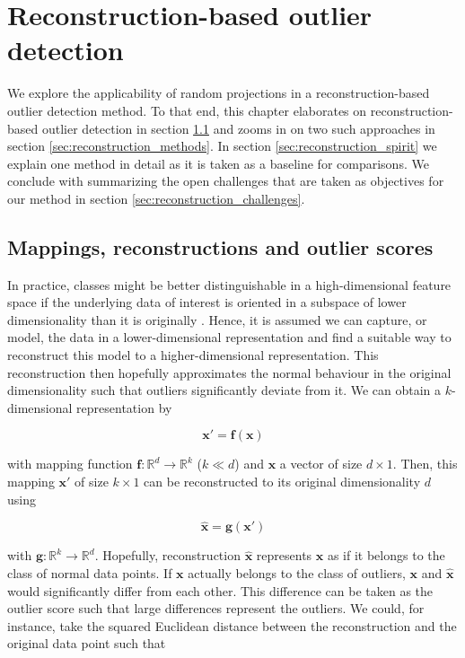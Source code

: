 \chapter{Reconstruction-based outlier detection}
\label{chap:reconstruction-detection}

We explore the applicability of random projections in a reconstruction-based outlier detection method.
To that end, this chapter elaborates on reconstruction-based outlier detection in section \ref{sec:reconstruction_mappings} and zooms in on two such approaches in section \ref{sec:reconstruction_methods}. In section \ref{sec:reconstruction_spirit} we explain one method in detail as it is taken as a baseline for comparisons. We conclude with summarizing the open challenges that are taken as objectives for our method in section \ref{sec:reconstruction_challenges}.

\section{Mappings, reconstructions and outlier scores}
\label{sec:reconstruction_mappings}

In practice, classes might be better distinguishable in a high-dimensional feature space if the underlying data of interest is oriented in a subspace of lower dimensionality than it is originally \cite{beyer1999nearest}. Hence, it is assumed we can capture, or model, the data in a lower-dimensional representation and find a suitable way to reconstruct this model to a higher-dimensional representation. This reconstruction then hopefully approximates the normal behaviour in the original dimensionality such that outliers significantly deviate from it. We can obtain a $k$-dimensional representation by

\begin{equation}\label{eq:reconstruction_projection}
\mathbf{x}' = \mathbf{f}(\mathbf{x})
\end{equation}  

\noindent with mapping function $\mathbf{f} : \mathbb{R}^d \to \mathbb{R}^k$ ($k \ll d$) and $\mathbf{x}$ a vector of size $d \times 1$. Then, this mapping $\mathbf{x}'$ of size $k \times 1$ can be reconstructed to its original dimensionality $d$ using

\begin{equation}\label{eq:reconstruction_reconstruction}
\hat{\mathbf{x}} = \mathbf{g}(\mathbf{x}')
\end{equation}  

\noindent with $\mathbf{g} : \mathbb{R}^k \to \mathbb{R}^d$. Hopefully, reconstruction $\hat{\mathbf{x}}$ represents $\mathbf{x}$ as if it belongs to the class of normal data points. If $\mathbf{x}$ actually belongs to the class of outliers, $\mathbf{x}$ and $\hat{\mathbf{x}}$ would significantly differ from each other. This difference can be taken as the outlier score such that large differences represent the outliers. We could, for instance, take the squared Euclidean distance between the reconstruction and the original data point such that

